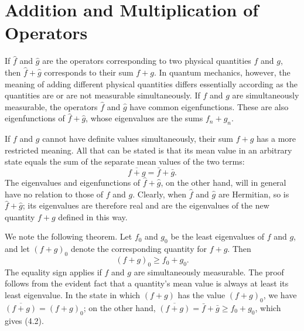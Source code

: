 \section{Addition and Multiplication of Operators}

If $\hat f$ and $\hat g$ are the operators corresponding to two physical
quantities $f$ and $g$, then $\hat f+\hat g$ corresponds to their sum $f+g$.
In quantum mechanics, however, the meaning of adding different physical
quantities differs essentially according as the quantities are or are not
measurable simultaneously. If $f$ and $g$
are simultaneously measurable, the operators $\hat f$ and $\hat g$ have
common eigenfunctions. These are also eigenfunctions of $\hat f+\hat g$, whose
eigenvalues are the sums $f_n+g_n$.

If $f$ and $g$ cannot have definite values simultaneously, their sum $f+g$
has a more restricted meaning. All that can be stated is that its mean value
in an arbitrary state equals the sum of the separate mean values of the two
terms:
\begin{equation}
  \overline{f+g}=\bar f+\bar g.
  \tag{4.1}
\end{equation}
The eigenvalues and eigenfunctions of $\hat f+\hat g$, on the other hand, will
in general have no relation to those of $f$ and $g$. Clearly, when $\hat f$
and $\hat g$ are Hermitian, so is $\hat f+\hat g$; its eigenvalues are
therefore real and are the eigenvalues of the new quantity $f+g$ defined in
this way.

We note the following theorem. Let $f_0$ and $g_0$ be the least eigenvalues of
$f$ and $g$, and let $(f+g)_0$ denote the corresponding quantity for $f+g$.
Then
\begin{equation}
  (f+g)_0\geq f_0+g_0.
  \tag{4.2}
\end{equation}
The equality sign applies if $f$ and $g$ are simultaneously measurable. The
proof follows from the evident fact that a quantity's mean value is always at
least its least eigenvalue. In the state in which $(f+g)$ has the value
$(f+g)_0$, we have $\overline{(f+g)}=(f+g)_0$; on the other hand,
$\overline{(f+g)}=\bar f+\bar g\geq f_0+g_0$, which gives (4.2).

